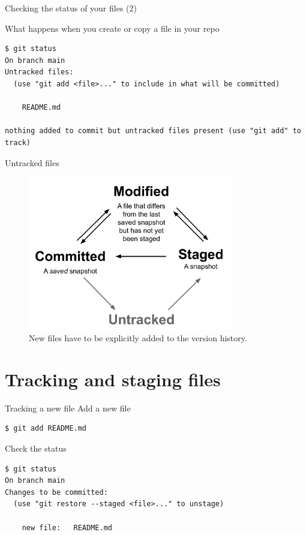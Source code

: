 \documentclass[handout]{beamer}
\begin{document}
\begin{frame}[fragile]{Checking the status of your files (2)}

What happens when you create or copy a file in your repo

\begin{lstlisting}
$ git status
On branch main
Untracked files:
  (use "git add <file>..." to include in what will be committed)

    README.md

nothing added to commit but untracked files present (use "git add" to track)
\end{lstlisting}
\end{frame}

\begin{frame}{Untracked files}
	\begin{figure}
		\includegraphics[width=0.8\textwidth]{figures/git_4states.pdf}
		\caption{New files have to be explicitly added to the version history.}
	\end{figure}
\end{frame}

\section{Tracking and staging files}

\begin{frame}[fragile]{Tracking a new file}
Add a new file
\begin{lstlisting}
$ git add README.md    
\end{lstlisting}
Check the status 
\begin{lstlisting}
$ git status
On branch main
Changes to be committed:
  (use "git restore --staged <file>..." to unstage)

    new file:   README.md
\end{lstlisting}
\end{frame}
\end{document}
